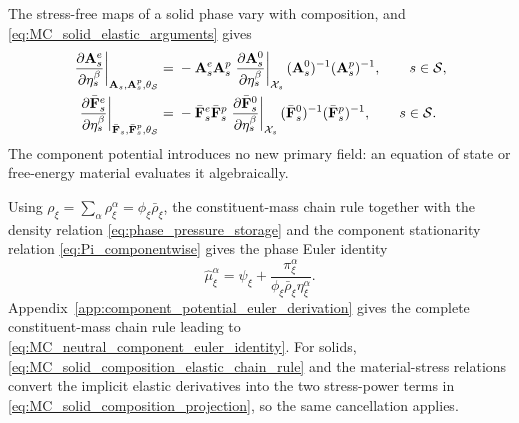 The stress-free maps of a solid phase vary with composition, and
\eqref{eq:MC_solid_elastic_arguments} gives
%
\begin{subequations}
	\label{eq:MC_solid_composition_elastic_chain_rule}
	\begin{align}
		\left.
		\frac{\partial \mathbf{A}_s^e}{\partial \eta_s^\beta}
		\right\vert_{
			\mathbf{A}_s,\mathbf{A}_s^p,\theta_{\mathcal{S}}
		}
		={} &
		-\mathbf{A}_s^e\mathbf{A}_s^p
		\left.
		\frac{\partial \mathbf{A}_s^0}{\partial \eta_s^\beta}
		\right\vert_{\mathcal{X}_s}
		(\mathbf{A}_s^0)^{-1}
		(\mathbf{A}_s^p)^{-1},
		\qquad
		s\in\mathcal{S},
		\label{eq:MC_solid_distension_composition_chain_rule}
		\\
		\left.
		\frac{\partial \bar{\mathbf{F}}_s^e}{\partial \eta_s^\beta}
		\right\vert_{
			\bar{\mathbf{F}}_s,\bar{\mathbf{F}}_s^p,\theta_{\mathcal{S}}
		}
		={} &
		-\bar{\mathbf{F}}_s^e\bar{\mathbf{F}}_s^p
		\left.
		\frac{\partial \bar{\mathbf{F}}_s^0}{\partial \eta_s^\beta}
		\right\vert_{\mathcal{X}_s}
		(\bar{\mathbf{F}}_s^0)^{-1}
		(\bar{\mathbf{F}}_s^p)^{-1},
		\qquad
		s\in\mathcal{S} .
		\label{eq:MC_solid_true_deformation_composition_chain_rule}
	\end{align}
\end{subequations}
%
The component potential introduces no new primary field: an equation of state
or free-energy material evaluates it algebraically.

Using \(\rho_\xi=\sum_\alpha\rho_\xi^\alpha
=\phi_\xi\bar\rho_\xi\), the constituent-mass chain rule together with the
density relation \eqref{eq:phase_pressure_storage} and the component
stationarity relation \eqref{eq:Pi_componentwise} gives the phase Euler
identity
%
\begin{equation}
	\hat\mu_\xi^\alpha
	=
	\psi_\xi
	+
	\frac{\pi_\xi^\alpha}
	{\phi_\xi\bar\rho_\xi\eta_\xi^\alpha}.
	\label{eq:MC_neutral_component_euler_identity}
\end{equation}
%
Appendix~\ref{app:component_potential_euler_derivation} gives the complete
constituent-mass chain rule leading to
\eqref{eq:MC_neutral_component_euler_identity}.  For solids,
\eqref{eq:MC_solid_composition_elastic_chain_rule} and the material-stress
relations convert the implicit elastic derivatives into the two stress-power
terms in \eqref{eq:MC_solid_composition_projection}, so the same cancellation
applies.

